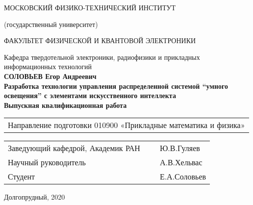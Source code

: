 \pagestyle{empty} %

\begin{center}
     
    МОСКОВСКИЙ ФИЗИКО-ТЕХНИЧЕСКИЙ ИНСТИТУТ
    
    (государственный университет)
    
    ФАКУЛЬТЕТ ФИЗИЧЕСКОЙ И  КВАНТОВОЙ ЭЛЕКТРОНИКИ

    \bigskip

    \bigskip
    Кафедра твердотельной электроники, радиофизики и прикладных информационных технологий\\[10mm]

    \textsf{\large\bfseries
        СОЛОВЬЕВ Егор Андреевич\\[10mm]
        Разработка технологии управления распределенной системой “умного освещения” с элементами искусственного интеллекта\\[15pt]
        Выпускная квалификационная работа
    }\\[10mm]

\begin{tabular}{l}
Направление подготовки 010900 «Прикладные математика и физика» \\
[25pt]
\end{tabular}



    \begin{tabular}{p{250pt}p{100pt}p{100pt}} 
        Заведующий кафедрой, Академик РАН &  &~Ю.В.Гуляев \\ [15pt]
        Научный руководитель & &~А.В.Хельвас \\ [15pt]
        Студент & &~Е.А.Соловьев  \\ 
    \end{tabular}

    \vspace{\fill}
    Долгопрудный, 2020
\end{center}
